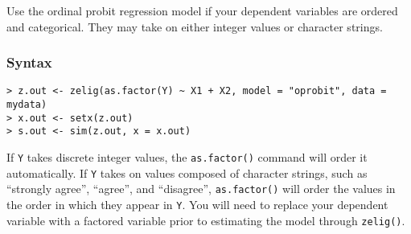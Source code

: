 \documentclass{article}
\begin{document}
Use the ordinal probit regression model if your dependent variables
are ordered and categorical.  They may take on either integer values
or character strings.  

\subsubsection{Syntax}

\begin{verbatim}
> z.out <- zelig(as.factor(Y) ~ X1 + X2, model = "oprobit", data = mydata)
> x.out <- setx(z.out)
> s.out <- sim(z.out, x = x.out)
\end{verbatim}
If {\tt Y} takes discrete integer values, the {\tt as.factor()}
command will order it automatically.  If {\tt Y} takes on values
composed of character strings, such as ``strongly agree'', ``agree'',
and ``disagree'', {\tt as.factor()} will order the values in the order
in which they appear in {\tt Y}.  You will need to replace your
dependent variable with a factored variable prior to estimating the
model through {\tt zelig()}.
\end{document}
